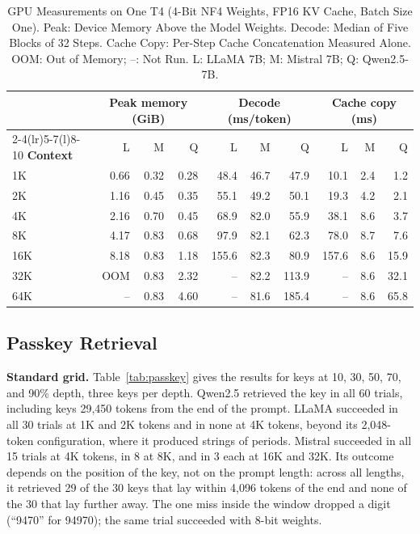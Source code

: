 \documentclass[conference]{IEEEtran}
\begin{document}
\begin{table}[!t]
\caption{GPU Measurements on One T4 (4-Bit NF4 Weights, FP16 KV Cache, Batch Size One). Peak: Device Memory Above the Model Weights. Decode: Median of Five Blocks of 32 Steps. Cache Copy: Per-Step Cache Concatenation Measured Alone. OOM: Out of Memory; --: Not Run. L: LLaMA 7B; M: Mistral 7B; Q: Qwen2.5-7B.}
\label{tab:gpu}
\centering
\footnotesize
\setlength{\tabcolsep}{5pt}
\begin{tabular}{@{}lrrrrrrrrr@{}}
\toprule
 & \multicolumn{3}{c}{\textbf{Peak memory (GiB)}} & \multicolumn{3}{c}{\textbf{Decode (ms/token)}} & \multicolumn{3}{c}{\textbf{Cache copy (ms)}} \\
\cmidrule(lr){2-4}\cmidrule(lr){5-7}\cmidrule(l){8-10}
\textbf{Context} & L & M & Q & L & M & Q & L & M & Q \\
\midrule
1K & 0.66 & 0.32 & 0.28 & 48.4 & 46.7 & 47.9 & 10.1 & 2.4 & 1.2 \\
2K & 1.16 & 0.45 & 0.35 & 55.1 & 49.2 & 50.1 & 19.3 & 4.2 & 2.1 \\
4K & 2.16 & 0.70 & 0.45 & 68.9 & 82.0 & 55.9 & 38.1 & 8.6 & 3.7 \\
8K & 4.17 & 0.83 & 0.68 & 97.9 & 82.1 & 62.3 & 78.0 & 8.7 & 7.6 \\
16K & 8.18 & 0.83 & 1.18 & 155.6 & 82.3 & 80.9 & 157.6 & 8.6 & 15.9 \\
32K & OOM & 0.83 & 2.32 & -- & 82.2 & 113.9 & -- & 8.6 & 32.1 \\
64K & -- & 0.83 & 4.60 & -- & 81.6 & 185.4 & -- & 8.6 & 65.8 \\
\bottomrule
\end{tabular}
\end{table}

\subsection{Passkey Retrieval}
\label{sec:passkey}
\textbf{Standard grid.} Table~\ref{tab:passkey} gives the results for keys at 10, 30, 50, 70, and 90\% depth, three keys per depth. Qwen2.5 retrieved the key in all 60 trials, including keys 29,450 tokens from the end of the prompt. LLaMA succeeded in all 30 trials at 1K and 2K tokens and in none at 4K tokens, beyond its 2,048-token configuration, where it produced strings of periods. Mistral succeeded in all 15 trials at 4K tokens, in 8 at 8K, and in 3 each at 16K and 32K. Its outcome depends on the position of the key, not on the prompt length: across all lengths, it retrieved 29 of the 30 keys that lay within 4,096 tokens of the end and none of the 30 that lay further away. The one miss inside the window dropped a digit (``9470'' for 94970); the same trial succeeded with 8-bit weights.
\end{document}
